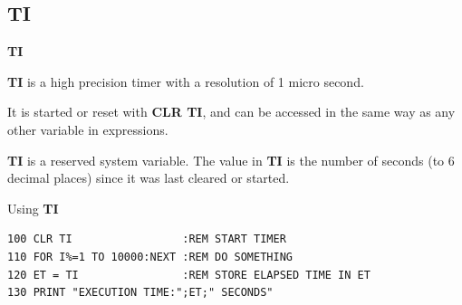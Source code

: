 \newpage
\subsection{TI}
\begin{description}[leftmargin=2cm,style=nextline]
\item [Format:] {\bf TI}
\item [Usage:]  {\bf TI} is a high precision timer with
                a resolution of 1 micro second.

                It is started or reset with
                {\bf CLR TI}, and can be accessed in the same way as any
                other variable in expressions.
\item [Remarks:] {\bf TI} is a reserved system variable. The value in {\bf TI}
                 is the number of seconds (to 6 decimal places) since it was last cleared or started.

\item [Example:] Using {\bf TI}
\begin{tcolorbox}[colback=black,coltext=white]
\verbatimfont{\codefont}
\begin{verbatim}
100 CLR TI                 :REM START TIMER
110 FOR I%=1 TO 10000:NEXT :REM DO SOMETHING
120 ET = TI                :REM STORE ELAPSED TIME IN ET
130 PRINT "EXECUTION TIME:";ET;" SECONDS"
\end{verbatim}
\end{tcolorbox}
\end{description}


\newpage
